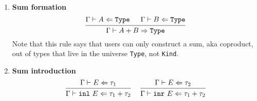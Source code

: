 \documentclass{article}
\begin{document}
\begin{enumerate}

  \item \textbf{Sum formation} \\
  \[
    \begin{prooftree}
      \hypo{\Gamma \vdash A \Leftarrow \Type} 
      \hypo{\Gamma \vdash B \Leftarrow \Type} 
      \infer2{\Gamma \vdash A + B \Rightarrow \Type} 
    \end{prooftree}
  \]
  Note that this rule says that users can only construct a sum, aka 
  coproduct, out of types that live in the universe \texttt{Type}, not 
  \verb|Kind|.



  \item \textbf{Sum introduction} \\
  \begin{gather*}
    \begin{prooftree}
      \hypo{\Gamma \vdash E \Leftarrow \tau_1} 
      \infer1{\Gamma \vdash \inl \,\, E \Leftarrow \tau_1 + \tau_2} 
    \end{prooftree}
    ~ \quad
    \begin{prooftree}
    \hypo{\Gamma \vdash E \Leftarrow \tau_2} 
    \infer1{\Gamma \vdash \inr \,\, E \Leftarrow \tau_1 + \tau_2} 
    \end{prooftree}
  \end{gather*}


\end{enumerate}
\end{document}
